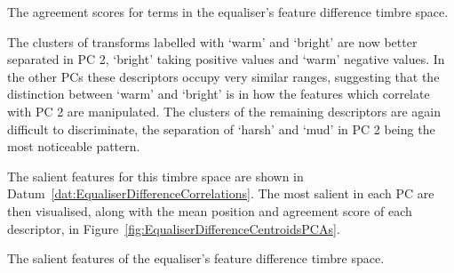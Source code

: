 			\begin{table}[h!]
				\centering
				
				\caption{The agreement scores for terms in the 
					 equaliser's feature difference timbre space.}
				\label{tab:EqualiserDifferenceAgreements}
			\end{table}

			The clusters of transforms labelled with `warm' and `bright' are now better separated in PC 2,
			`bright' taking positive values and `warm' negative values. In the other PCs these descriptors
			occupy very similar ranges, suggesting that the distinction between `warm' and `bright' is in how
			the features which correlate with PC 2 are manipulated. The clusters of the remaining descriptors
			are again difficult to discriminate, the separation of `harsh' and `mud' in PC 2 being the most
			noticeable pattern.

			The salient features for this timbre space are shown in
			Datum~\ref{dat:EqualiserDifferenceCorrelations}. The most salient in each PC are then visualised,
			along with the mean position and agreement score of each descriptor, in
			Figure~\ref{fig:EqualiserDifferenceCentroidsPCAs}. 

			\begin{datum}[h!]
				\centering
				\begin{minipage}{0.9\textwidth}
					
				\end{minipage}
				\caption{The salient features of the equaliser's
					 feature difference timbre space.}
				\label{dat:EqualiserDifferenceCorrelations}
			\end{datum}

